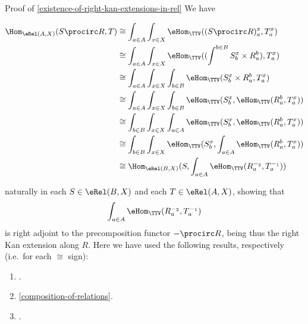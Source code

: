 \begin{Proof}{Proof of \cref{existence-of-right-kan-extensions-in-rel}}%
    We have
    \begin{envsmallsize}
        \begin{align*}
            \Hom_{\eRel(A,X)}(S\procirc R,T) &\cong  \int_{a\in A}\int_{x\in X}\eHom_{\TTV}((S\procirc R)^{x}_{a},T^{x}_{a})\\
                                             &\cong  \int_{a\in A}\int_{x\in X}\eHom_{\TTV}((\int^{b\in B}S^{x}_{b}\times R^{b}_{a}),T^{x}_{a})\\
                                             &\cong  \int_{a\in A}\int_{x\in X}\int_{b\in B}\eHom_{\TTV}(S^{x}_{b}\times R^{b}_{a},T^{x}_{a})\\
                                             &\cong  \int_{a\in A}\int_{x\in X}\int_{b\in B}\eHom_{\TTV}(S^{x}_{b},\eHom_{\TTV}(R^{b}_{a},T^{x}_{a}))\\
                                             &\cong  \int_{b\in B}\int_{x\in X}\int_{a\in A}\eHom_{\TTV}(S^{x}_{b},\eHom_{\TTV}(R^{b}_{a},T^{x}_{a}))\\
                                             &\cong  \int_{b\in B}\int_{x\in X}\eHom_{\TTV}(S^{x}_{b},\int_{a\in A}\eHom_{\TTV}(R^{b}_{a},T^{x}_{a}))\\
                                             &\cong  \Hom_{\eRel(B,X)}(S,\int_{a\in A}\eHom_{\TTV}(R^{-_{2}}_{a},T^{-_{1}}_{a}))%
        \end{align*}
    \end{envsmallsize}
    naturally in each $S\in\eRel(B,X)$ and each $T\in\eRel(A,X)$, showing that
    \[
        \int_{a\in A}\eHom_{\TTV}(R^{-_{2}}_{a},T^{-_{1}}_{a})%
    \]%
    is right adjoint to the precomposition functor $-\procirc R$, being thus the right Kan extension along $R$. Here we have used the following results, respectively (i.e.\ for each $\cong$ sign):
    \begin{enumerate}
        \item\label{proof-of-existence-of-right-kan-extensions-in-rel-1}.
        \item\label{proof-of-existence-of-right-kan-extensions-in-rel-2}\cref{composition-of-relations}.
        \item\label{proof-of-existence-of-right-kan-extensions-in-rel-3}.

\end{enumerate}
\end{Proof}
